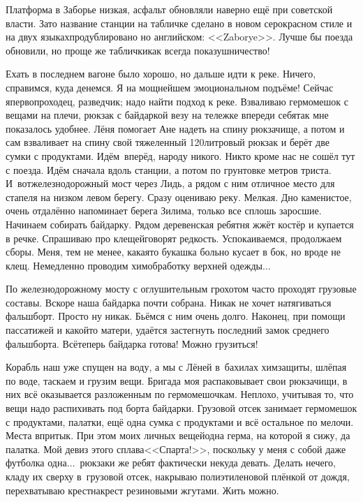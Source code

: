 Платформа в Заборье низкая, асфальт обновляли наверно ещё при советской власти. Зато название станции на табличке сделано в новом серо\sdash красном стиле и на двух языках\mdash продублировано но английском: <<Zaborye>>. Лучше бы поезда обновили, но проще же таблички\mdash как всегда показушничество! 

Ехать в последнем вагоне было хорошо, но дальше идти к реке. Ничего, справимся, куда денемся. Я на мощнейшем эмоциональном подъёме! Сейчас я\mdash первопроходец, разведчик; надо найти подход к реке.  Взваливаю гермомешок с вещами на плечи, рюкзак с байдаркой везу на тележке впереди себя\mdash так мне показалось удобнее. Лёня помогает Ане надеть на спину рюкзачище, а потом и сам взваливает на спину свой тяжеленный 120\sdash литровый рюкзак и берёт две сумки с продуктами. Идём~вперёд, народу никого. Никто кроме нас не сошёл тут с поезда. Идём сначала вдоль станции, а потом по грунтовке метров триста. И~вот\mdash железнодорожный мост через Лидь, а рядом с ним отличное место для стапеля на низком левом берегу. 
\newpage
Сразу оцениваю реку. Мелкая. Дно каменистое, очень отдалённо напоминает берега Зилима, только все сплошь заросшие. Начинаем собирать байдарку. Рядом деревенская ребятня жжёт костёр и купается в речке. Спрашиваю про клещей\mdash говорят редкость. Успокаиваемся, продолжаем сборы. Меня, тем не менее, какая\sdash то букашка больно кусает в бок, но вроде не клещ. Немедленно проводим химобработку верхней одежды$\ldots$

По железнодорожному мосту с оглушительным грохотом часто проходят грузовые составы. Вскоре наша байдарка почти собрана. Никак не хочет натягиваться фальшборт. Просто ну никак. Бьёмся с ним очень долго. Наконец, при помощи пассатижей и какой\sdash то матери, удаётся застегнуть последний замок среднего фальшборта. Всё\mdash теперь байдарка готова! Можно грузиться! 

Корабль наш уже спущен на воду, а мы с Лёней в~бахилах химзащиты, шлёпая по воде, таскаем и грузим вещи. Бригада моя распаковывает свои рюкзачищи, в них всё оказывается разложенным по гермомешочкам. Неплохо, учитывая то, что вещи надо распихивать под борта байдарки. Грузовой отсек занимает гермомешок с продуктами, палатки, ещё одна сумка с продуктами и всё остальное по мелочи. Места впритык. При этом моих личных вещей\mdash одна герма, на которой я сижу, да палатка. Мой девиз этого сплава\mdash <<Спарта!>>, поскольку у меня с собой даже футболка одна$\ldots$~рюкзаки же ребят фактически некуда девать. Делать нечего, кладу их сверху в~грузовой отсек, накрываю полиэтиленовой плёнкой от дождя, перехватываю крест\sdash накрест резиновыми жгутами. Жить можно. 


